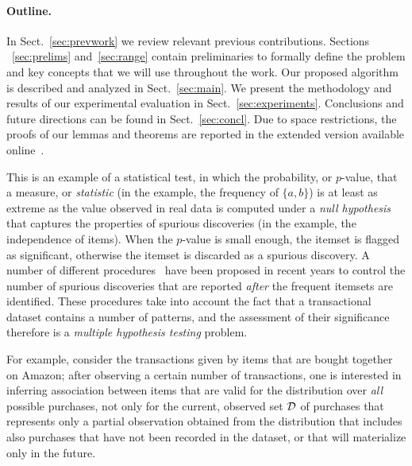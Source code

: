 \paragraph*{Outline.} 
In Sect.~\ref{sec:prevwork} we review relevant previous contributions.
Sections ~\ref{sec:prelims} and~\ref{sec:range} contain preliminaries to formally define the problem
and key concepts that we will use throughout the work. Our proposed algorithm is
described and analyzed in Sect.~\ref{sec:main}. We present the methodology and
results of our experimental evaluation in Sect.~\ref{sec:experiments}.
Conclusions and future directions can be found in Sect.~\ref{sec:concl}. 
\ifarxiv
\else
Due to space restrictions, the proofs of our lemmas
and theorems are reported in the extended version available
online~\citep{RiondatoV14-full}.
\fi

\iffalse
This is an example of a statistical test, in which the probability, or $p$-value,
that a measure, or \emph{statistic} (in the example, the frequency of $\{a,b\}$)
is at least as extreme as the value observed in real data is computed under a
\emph{null hypothesis} that captures the properties of spurious discoveries (in
the example, the independence of items). When the $p$-value is small enough, the
itemset is flagged as significant, otherwise the itemset is discarded as a
spurious discovery. A number of different procedures~\citep{SilversteinBM98,MegiddoS98,DuMouchelP01,GionisMMT07,Hamalainen10,KirschMAPUV12} have been proposed
in recent years to control the number of spurious discoveries that are reported
\emph{after} the frequent itemsets are identified. These procedures take into
account the fact that a transactional dataset contains a number of patterns, and
the assessment of their significance therefore is a \emph{multiple
hypothesis testing} problem.


For example, consider
the transactions given by items that are bought together on Amazon; after
observing a certain number of transactions, one is interested in inferring
association between items that are valid for the distribution over \emph{all} possible
purchases, not only for the current, observed set ${\cal D}$ of purchases that
represents only a partial observation obtained from the distribution that
includes also purchases that have not been recorded in the dataset, or that will
materialize only in the future.

